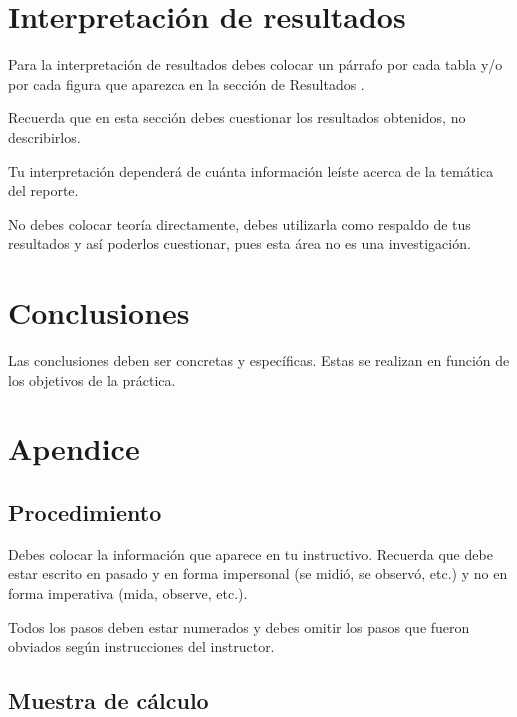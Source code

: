 \documentclass[osajnl,onecolumn,showpacs,superscriptaddress,12pt]{revtex4-1}
\begin{document}
\section{Interpretación de resultados}


Para la interpretación de resultados debes colocar un párrafo por cada tabla y/o por cada figura que aparezca en la sección de Resultados .\

Recuerda que en esta sección debes cuestionar los resultados obtenidos, no describirlos.\ 

Tu interpretación dependerá de cuánta información leíste acerca de la temática del reporte. \

No debes colocar teoría directamente, debes utilizarla como respaldo de tus resultados y así poderlos
cuestionar, pues esta área no es una investigación.


\section{Conclusiones}

Las conclusiones deben ser concretas y específicas. Estas se realizan en función de los objetivos de la práctica.


\section{Apendice}

\subsection{Procedimiento}

Debes colocar la información que aparece en tu instructivo. Recuerda que debe estar escrito en pasado y en forma impersonal (se midió, se observó, etc.) y no en forma imperativa (mida, observe, etc.).\

Todos los pasos deben estar numerados y debes omitir los pasos que fueron obviados según
instrucciones del instructor.



\subsection{Muestra de cálculo}
\end{document}
